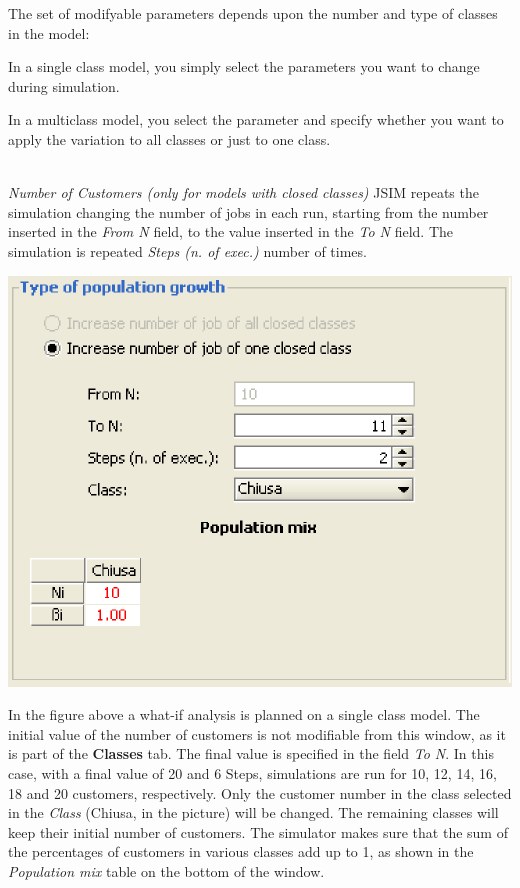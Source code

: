 \begin{description*}
The set of modifyable parameters depends upon the number and type of classes in the model:
\begin{itemize*}
\item In a single class model, you simply select the parameters you want to change during simulation.
\item In a multiclass model, you select the parameter and specify whether you want to apply the variation to all classes or just to one class.
\end{itemize*} 
\\
\textit{Number of Customers (only for models with closed classes)}
JSIM repeats the simulation changing the number of jobs in each run, starting from the number inserted in the \emph{From N} field, to the value inserted in the \emph{To N} field. The simulation is repeated \emph{Steps (n. of exec.)} number of times.
\begin{center}
\includegraphics[scale=.5]{img/jsim/customers.eps}
\end{center}
In the figure above a what-if analysis is planned on a single class model.
The initial value of the number of customers is not modifiable from this window, as it is part of the \textbf{Classes} tab. The final value is specified in the field \emph{To N}. In this case, with a final value of 20 and 6 Steps, simulations are run for 10, 12, 14, 16, 18 and 20 customers, respectively. Only the customer number in the class selected in the \emph{Class} (Chiusa, in the picture) will be changed. The remaining classes will keep their initial number of customers. The simulator makes sure that the sum of the percentages of customers in various classes add up to 1, as shown in the \emph{Population mix} table on the bottom of the window.

\end{description*}
